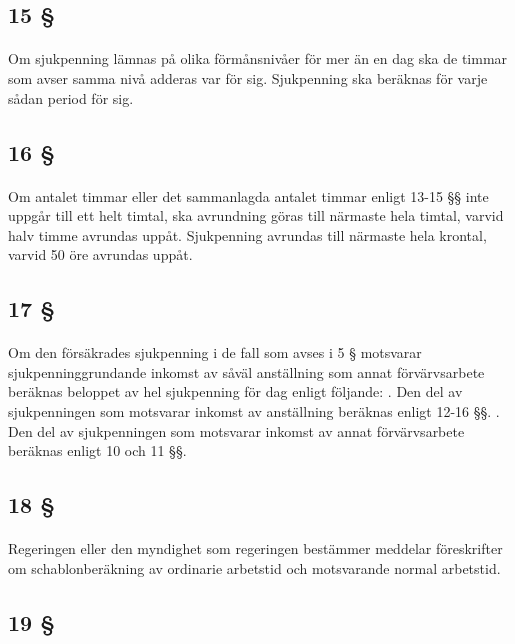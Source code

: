 \documentclass[a4paper,notitlepage,openany,10pt]{book}
\begin{document}
\subsection*{15 §}
\paragraph*{}
Om sjukpenning lämnas på olika förmånsnivåer för mer än en dag ska de timmar som avser samma nivå adderas var för sig. Sjukpenning ska beräknas för varje sådan period för sig.
\subsection*{16 §}
\paragraph*{}
Om antalet timmar eller det sammanlagda antalet timmar enligt 13-15 §§ inte uppgår till ett helt timtal, ska avrundning göras till närmaste hela timtal, varvid halv timme avrundas uppåt.
Sjukpenning avrundas till närmaste hela krontal, varvid 50 öre avrundas uppåt.
\subsection*{17 §}
\paragraph*{}
Om den försäkrades sjukpenning i de fall som avses i 5 § motsvarar sjukpenninggrundande inkomst av såväl anställning som annat förvärvsarbete beräknas beloppet av hel sjukpenning för dag enligt följande:
. Den del av sjukpenningen som motsvarar inkomst av anställning beräknas enligt 12-16 §§.
. Den del av sjukpenningen som motsvarar inkomst av annat förvärvsarbete beräknas enligt 10 och 11 §§.
\subsection*{18 §}
\paragraph*{}
Regeringen eller den myndighet som regeringen bestämmer meddelar föreskrifter om schablonberäkning av ordinarie arbetstid och motsvarande normal arbetstid.
\subsection*{19 §}
\end{document}
